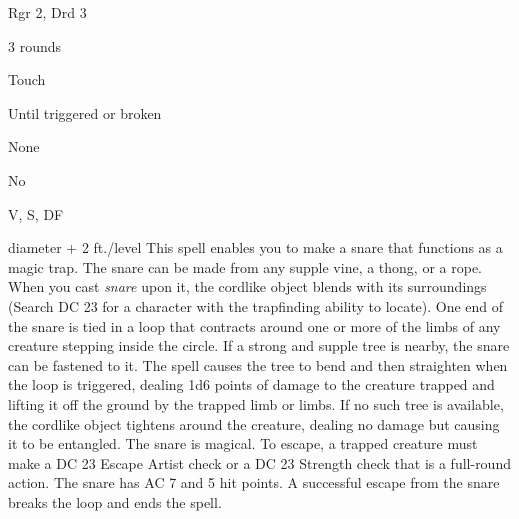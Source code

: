 
\begin{description*}
\item[Level:] Rgr 2, Drd 3
\item[Casting Time:] 3 rounds
\item[Range:] Touch
\item[Duration:] Until triggered or broken
\item[Saving Throw:] None
\item[Spell Resistance:] No
\item[Components:] V, S, DF
\end{description*}

diameter + 2 ft./level
This spell enables you to make a snare that functions as a magic trap. The snare
can be made from any supple vine, a thong, or a rope. When you cast \textit{snare
}upon it, the cordlike object blends with its surroundings (Search DC 23 for a
character with the trapfinding ability to locate). One end of the snare is tied
in a loop that contracts around one or more of the limbs of any creature stepping
inside the circle.
If a strong and supple tree is nearby, the snare can be fastened to it. The spell
causes the tree to bend and then straighten when the loop is triggered, dealing
1d6 points of damage to the creature trapped and lifting it off the ground by the
trapped limb or limbs. If no such tree is available, the cordlike object tightens
around the creature, dealing no damage but causing it to be entangled.
The snare is magical. To escape, a trapped creature must make a DC 23 Escape Artist
check or a DC 23 Strength check that is a full-round action. The snare has AC 7
and 5 hit points. A successful escape from the snare breaks the loop and ends the
spell.